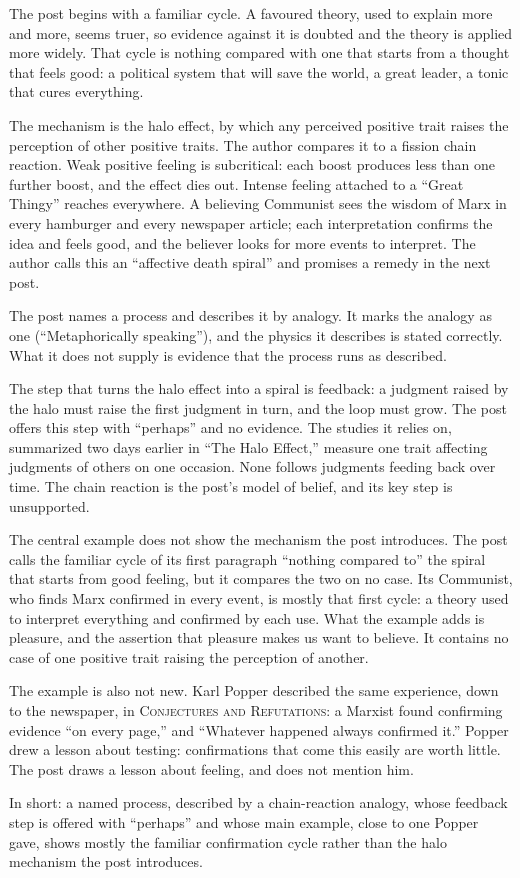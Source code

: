 \begin{afterword}
\summaryhead

The post begins with a familiar cycle. A favoured theory, used to explain more and more, seems truer, so evidence against it is doubted and the theory is applied more widely. That cycle is nothing compared with one that starts from a thought that feels good: a political system that will save the world, a great leader, a tonic that cures everything.

The mechanism is the halo effect, by which any perceived positive trait raises the perception of other positive traits. The author compares it to a fission chain reaction. Weak positive feeling is subcritical: each boost produces less than one further boost, and the effect dies out. Intense feeling attached to a ``Great Thingy'' reaches everywhere. A believing Communist sees the wisdom of Marx in every hamburger and every newspaper article; each interpretation confirms the idea and feels good, and the believer looks for more events to interpret. The author calls this an ``affective death spiral'' and promises a remedy in the next post.

\responsehead

The post names a process and describes it by analogy. It marks the analogy as one (``Metaphorically speaking''), and the physics it describes is stated correctly. What it does not supply is evidence that the process runs as described.

The step that turns the halo effect into a spiral is feedback: a judgment raised by the halo must raise the first judgment in turn, and the loop must grow. The post offers this step with ``perhaps'' and no evidence. The studies it relies on, summarized two days earlier in ``The Halo Effect,'' measure one trait affecting judgments of others on one occasion. None follows judgments feeding back over time. The chain reaction is the post's model of belief, and its key step is unsupported.

The central example does not show the mechanism the post introduces. The post calls the familiar cycle of its first paragraph ``nothing compared to'' the spiral that starts from good feeling, but it compares the two on no case. Its Communist, who finds Marx confirmed in every event, is mostly that first cycle: a theory used to interpret everything and confirmed by each use. What the example adds is pleasure, and the assertion that pleasure makes us want to believe. It contains no case of one positive trait raising the perception of another.

The example is also not new. Karl Popper described the same experience, down to the newspaper, in \textsc{Conjectures and Refutations}: a Marxist found confirming evidence ``on every page,'' and ``Whatever happened always confirmed it.'' Popper drew a lesson about testing: confirmations that come this easily are worth little. The post draws a lesson about feeling, and does not mention him.

In short: a named process, described by a chain-reaction analogy, whose feedback step is offered with ``perhaps'' and whose main example, close to one Popper gave, shows mostly the familiar confirmation cycle rather than the halo mechanism the post introduces.
\end{afterword}
